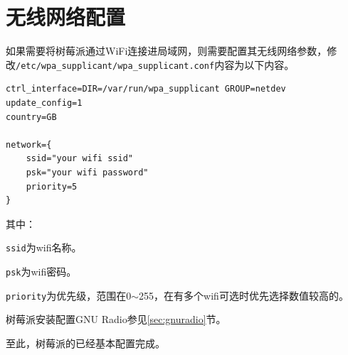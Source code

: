 	\section{无线网络配置}
		\par 如果需要将树莓派通过WiFi连接进局域网，则需要配置其无线网络参数，修改\lstinline[language=sh]{/etc/wpa_supplicant/wpa_supplicant.conf}内容为以下内容。
		\begin{lstlisting}
ctrl_interface=DIR=/var/run/wpa_supplicant GROUP=netdev
update_config=1
country=GB

network={
	ssid="your wifi ssid"
	psk="your wifi password"
	priority=5
}
		\end{lstlisting}
		\par 其中：
		\par \lstinline{ssid}为wifi名称。
		\par \lstinline{psk}为wifi密码。
		\par \lstinline{priority}为优先级，范围在0$\sim$255，在有多个wifi可选时优先选择数值较高的。
		\par 树莓派安装配置GNU Radio参见\ref{sec:gnuradio}节。
		\par 至此，树莓派的已经基本配置完成。
